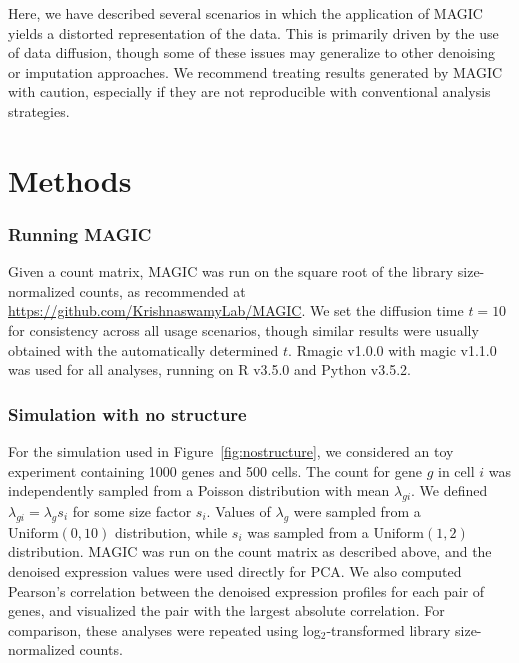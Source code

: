 \documentclass[10pt,letterpaper]{article}
\begin{document}
Here, we have described several scenarios in which the application of MAGIC yields a distorted representation of the data.
This is primarily driven by the use of data diffusion, though some of these issues may generalize to other denoising or imputation approaches.
We recommend treating results generated by MAGIC with caution, especially if they are not reproducible with conventional analysis strategies.

\section*{Methods}

\subsubsection*{Running MAGIC}
Given a count matrix, MAGIC was run on the square root of the library size-normalized counts, as recommended at \url{https://github.com/KrishnaswamyLab/MAGIC}.
We set the diffusion time $t=10$ for consistency across all usage scenarios, though similar results were usually obtained with the automatically determined $t$.
Rmagic v1.0.0 with magic v1.1.0 was used for all analyses, running on R v3.5.0 and Python v3.5.2.

\subsubsection*{Simulation with no structure}
For the simulation used in Figure~\ref{fig:nostructure}, we considered an toy experiment containing 1000 genes and 500 cells.
The count for gene $g$ in cell $i$ was independently sampled from a Poisson distribution with mean $\lambda_{gi}$.
We defined $\lambda_{gi}= \lambda_g s_i$ for some size factor $s_i$.
Values of $\lambda_g$ were sampled from a $\mbox{Uniform}(0, 10)$ distribution, while $s_i$ was sampled from a $\mbox{Uniform}(1, 2)$ distribution.       
MAGIC was run on the count matrix as described above, and the denoised expression values were used directly for PCA.
We also computed Pearson's correlation between the denoised expression profiles for each pair of genes, and visualized the pair with the largest absolute correlation.
For comparison, these analyses were repeated using log$_2$-transformed library size-normalized counts.
\end{document}
